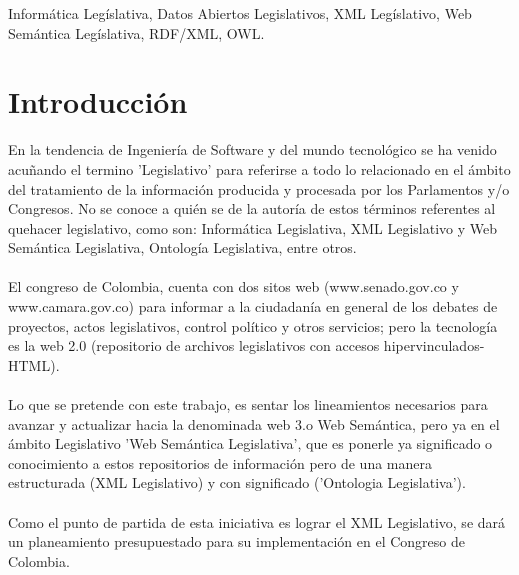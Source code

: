 \documentclass[conference]{IEEEtran}\usepackage[]{graphicx}\usepackage[]{color}
\begin{document}
\begin{IEEEkeywords}
	Informática Legíslativa, Datos Abiertos Legislativos, XML Legíslativo, Web Semántica Legíslativa, RDF/XML, OWL.
\end{IEEEkeywords}


\section{Introducción}
En la tendencia de Ingeniería de Software y del mundo tecnológico se ha venido acuñando el termino 'Legislativo' para referirse a todo lo relacionado en el ámbito del tratamiento de la información producida y procesada por los Parlamentos y/o Congresos. No se conoce a quién se de la autoría de estos términos referentes al quehacer legislativo, como son: Informática Legislativa, XML Legislativo y Web Semántica Legislativa, Ontología Legislativa, entre otros.\\ \\
El congreso de Colombia, cuenta con dos sitos web (www.senado.gov.co y www.camara.gov.co) para informar a la ciudadanía en general de los debates de proyectos, actos legislativos, control político y otros servicios; pero la tecnología es la web 2.0 (repositorio de archivos legislativos con accesos hipervinculados-HTML). \\ \\
Lo que se pretende con este trabajo, es sentar los lineamientos necesarios para avanzar y actualizar hacia la denominada web 3.o Web Semántica, pero ya en el ámbito Legislativo 'Web Semántica Legislativa', que es ponerle ya significado o conocimiento a estos repositorios de información pero de una manera estructurada (XML Legislativo) y con significado ('Ontologia Legislativa'). \\ \\ 
Como el punto de partida de esta iniciativa es lograr el XML Legislativo, se dará un planeamiento presupuestado para su implementación en el Congreso de Colombia.


\end{document}
